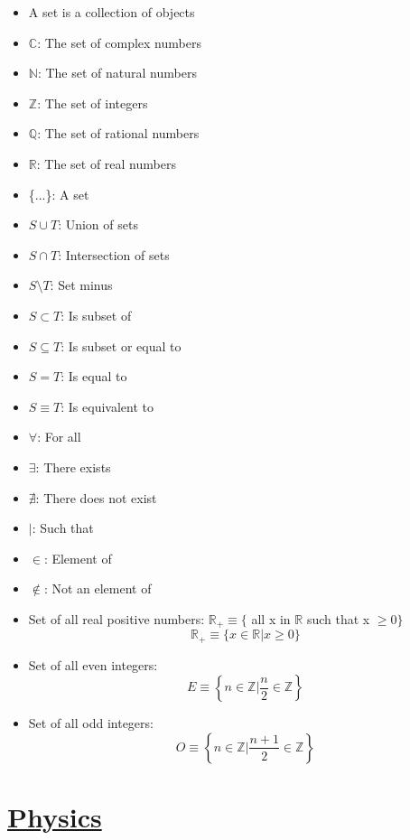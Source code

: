 \documentclass{article}
\begin{document}
\begin{itemize}
  \item A set is a collection of objects
  \item $\mathds{C}$: The set of complex numbers
  \item $\mathds{N}$: The set of natural numbers
  \item $\mathds{Z}$: The set of integers
  \item $\mathds{Q}$: The set of rational numbers
  \item $\mathds{R}$: The set of real numbers
  \item \{...\}: A set
  \item $S\cup T$: Union of sets
  \item $S\cap T$: Intersection of sets
  \item $S\setminus T$: Set minus
  \item $S\subset T$: Is subset of
  \item $S\subseteq T$: Is subset or equal to
  \item $S = T$: Is equal to
  \item $S\equiv T$: Is equivalent to
  \item $\forall$: For all
  \item $\exists$: There exists
  \item $\nexists$: There does not exist
  \item $|$: Such that
  \item $\in$: Element of
  \item $\notin$: Not an element of
  \item Set of all real positive numbers:
  $\mathds{R}_{+}\equiv\{$ all x in $\mathds{R}$ such that x $\geq0\}$
  \begin{equation*}
    \mathds{R}_{+}\equiv\{x \in \mathds{R}|x\geq0\}
  \end{equation*}
  \item Set of all even integers:
  \begin{equation*}
    E \equiv \left\{n \in \mathds{Z} | \frac{n}{2}\in\mathds{Z}\right\}
  \end{equation*}
  \item Set of all odd integers:
  \begin{equation*}
    O \equiv \left\{n \in \mathds{Z}|\frac{n+1}{2}\in\mathds{Z}\right\}
  \end{equation*}
\end{itemize}

\section{\underline{Physics}}
\end{document}
